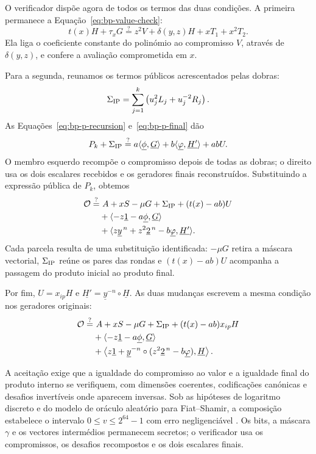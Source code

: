 O verificador dispõe agora de todos os termos das duas condições.
A primeira permanece a Equação~\eqref{eq:bp-value-check}:
\[
 t(x)H+\tau_xG
   \stackrel{?}{=}z^2V+\delta(y,z)H+xT_1+x^2T_2.
\]
Ela liga o coeficiente constante do polinómio ao compromisso \(V\),
através de \(\delta(y,z)\), e confere a avaliação comprometida em \(x\).

Para a segunda, reunamos os termos públicos acrescentados pelas dobras:
\[
 \Sigma_{\rm IP}=\sum_{j=1}^{k}\left(u_j^2L_j+u_j^{-2}R_j\right).
\]
As Equações~\eqref{eq:bp-p-recursion} e~\eqref{eq:bp-p-final} dão
\[
 P_k+\Sigma_{\rm IP}
   \stackrel{?}{=}a\langle\underline\phi,\underline G\rangle
     +b\langle\underline\varphi,\underline{H'}\rangle+abU.
\]
O membro esquerdo recompõe o compromisso depois de todas as dobras;
o direito usa os dois escalares recebidos e os geradores finais
reconstruídos. Substituindo a expressão pública de \(P_k\), obtemos
\begin{align*}
 \mathcal O\stackrel{?}{=}&\ A+xS-\mu G+\Sigma_{\rm IP}+(t(x)-ab)U\\
 &+\langle-z\underline1-a\underline\phi,\underline G\rangle\\
 &+\langle z\underline y^{\,n}+z^2\underline2^{\,n}
                  -b\underline\varphi,\underline{H'}\rangle.
\end{align*}
Cada parcela resulta de uma substituição identificada: \(-\mu G\)
retira a máscara vectorial, \(\Sigma_{\rm IP}\) reúne os pares das
rondas e \((t(x)-ab)U\) acompanha a passagem do produto inicial ao
produto final.

Por fim, \(U=x_{ip}H\) e
\(\underline{H'}=\underline y^{-n}\circ\underline H\). As duas
mudanças escrevem a mesma condição nos geradores originais:
\begin{equation}
\begin{split}
 \mathcal O\stackrel{?}{=}&\ A+xS-\mu G+\Sigma_{\rm IP}
                         +(t(x)-ab)x_{ip}H\\
 &+\langle-z\underline1-a\underline\phi,\underline G\rangle\\
 &+\left\langle z\underline1+\underline y^{-n}\circ
       (z^2\underline2^{\,n}-b\underline\varphi),
       \underline H\right\rangle.
\end{split}
\label{eq:bp-final}
\end{equation}

A aceitação exige que a igualdade do compromisso ao valor e a igualdade
final do produto interno se verifiquem, com dimensões coerentes,
codificações canónicas e desafios invertíveis onde aparecem inversas.
Sob as hipóteses de logaritmo discreto e do modelo de oráculo aleatório
para Fiat--Shamir, a composição estabelece o intervalo
\(0\leq v\leq2^{64}-1\) com erro negligenciável
\cite{Bulletproofs_paper}. Os bits, a máscara \(\gamma\) e os vectores
intermédios permanecem secretos; o verificador usa os compromissos,
os desafios recompostos e os dois escalares finais.

